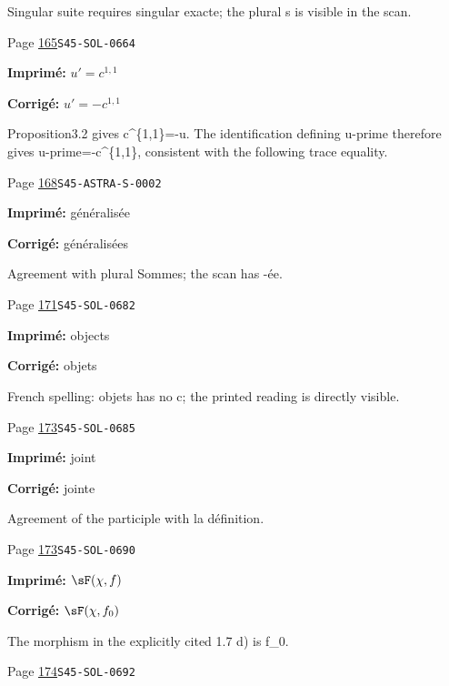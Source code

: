 \begin{description}
\par\noindent Singular suite requires singular exacte; the plural s is visible in the scan.
\smallskip
\item[\hypertarget{apparatus:FR-0134}{134}] Page \hyperlink{printpage:fr:165}{165}\quad\texttt{S45-SOL-0664}
\par\noindent\textbf{Imprimé:} \(u'=c^{1,1}\)
\par\noindent\textbf{Corrigé:} \(u'=-c^{1,1}\)
\par\noindent Proposition3.2 gives c\textasciicircum{}\{1,1\}=-u. The identification defining u-prime therefore gives u-prime=-c\textasciicircum{}\{1,1\}, consistent with the following trace equality.
\smallskip
\item[\hypertarget{apparatus:FR-0135}{135}] Page \hyperlink{printpage:fr:168}{168}\quad\texttt{S45-ASTRA-S-0002}
\par\noindent\textbf{Imprimé:} généralisée
\par\noindent\textbf{Corrigé:} généralisées
\par\noindent Agreement with plural Sommes; the scan has -ée.
\smallskip
\item[\hypertarget{apparatus:FR-0136}{136}] Page \hyperlink{printpage:fr:171}{171}\quad\texttt{S45-SOL-0682}
\par\noindent\textbf{Imprimé:} objects
\par\noindent\textbf{Corrigé:} objets
\par\noindent French spelling: objets has no c; the printed reading is directly visible.
\smallskip
\item[\hypertarget{apparatus:FR-0137}{137}] Page \hyperlink{printpage:fr:173}{173}\quad\texttt{S45-SOL-0685}
\par\noindent\textbf{Imprimé:} joint
\par\noindent\textbf{Corrigé:} jointe
\par\noindent Agreement of the participle with la définition.
\smallskip
\item[\hypertarget{apparatus:FR-0138}{138}] Page \hyperlink{printpage:fr:173}{173}\quad\texttt{S45-SOL-0690}
\par\noindent\textbf{Imprimé:} \(\sF(\chi,f)\)
\par\noindent\textbf{Corrigé:} \(\sF(\chi,f_0)\)
\par\noindent The morphism in the explicitly cited 1.7 d) is f\_0.
\smallskip
\item[\hypertarget{apparatus:FR-0139}{139}] Page \hyperlink{printpage:fr:174}{174}\quad\texttt{S45-SOL-0692}

\end{description}
